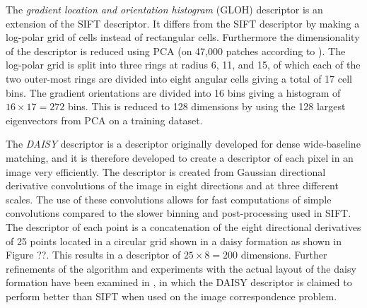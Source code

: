 \documentclass[../thesis.tex]{subfiles}
\begin{document}
The \emph{gradient location and orientation histogram} (GLOH) descriptor
\cite{mikolajczyk2005performance} is an extension of the SIFT descriptor.
It differs from the SIFT descriptor by making a log-polar grid of
cells instead of rectangular cells. Furthermore the dimensionality of
the descriptor is reduced using PCA (on 47,000 patches according to
\cite{mikolajczyk2005performance}). The log-polar grid is split into three
rings at radius 6, 11, and 15, of which each of the two outer-most rings are
divided into eight angular cells giving a total of 17 cell bins. The gradient
orientations are divided into 16 bins giving a histogram of $16 \times 17
= 272$ bins. This is reduced to 128 dimensions by using the 128 largest
eigenvectors from PCA on a training dataset.

The \emph{DAISY} descriptor \cite{tola2008fast} is a descriptor originally
developed for dense wide-baseline matching, and it is therefore developed
to create a descriptor of each pixel in an image very efficiently. The
descriptor is created from Gaussian directional derivative convolutions of
the image in eight directions and at three different scales. The use of these
convolutions allows for fast computations of simple convolutions compared
to the slower binning and post-processing used in SIFT. The descriptor of
each point is a concatenation of the eight directional derivatives of 25
points located in a circular grid shown in a daisy formation as shown in
Figure ??. This results in a descriptor of
$25 \times 8 = 200$ dimensions. Further refinements of the algorithm and
experiments with the actual layout of the daisy formation have been examined
in \cite{winder2009picking}, in which the DAISY descriptor is claimed to perform
better than SIFT when used on the image correspondence problem.
\end{document}
